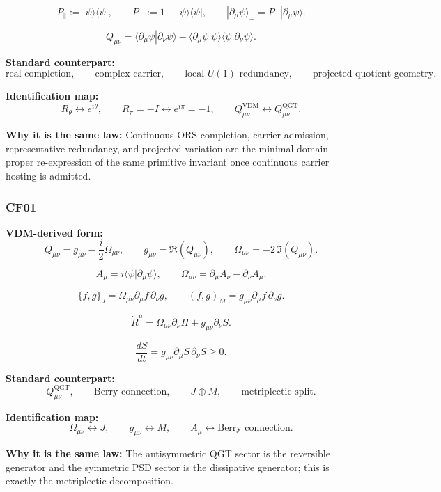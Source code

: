 \documentclass[11pt]{article}
\theoremstyle{definition}
\theoremstyle{plain}
\theoremstyle{remark}
\begin{document}
\[
P_{\parallel}:=|\psi\rangle\langle\psi|,
\qquad
P_{\perp}:=1-|\psi\rangle\langle\psi|,
\qquad
|\partial_\mu\psi\rangle_{\perp}=P_{\perp}|\partial_\mu\psi\rangle.
\]

\[
Q_{\mu\nu}
=
\langle \partial_\mu\psi|\partial_\nu\psi\rangle
-
\langle \partial_\mu\psi|\psi\rangle
\langle \psi|\partial_\nu\psi\rangle.
\]

\textbf{Standard counterpart:}
\[
\text{real completion},
\qquad
\text{complex carrier},
\qquad
\text{local }U(1)\text{ redundancy},
\qquad
\text{projected quotient geometry}.
\]

\textbf{Identification map:}
\[
R_\theta \leftrightarrow e^{i\theta},
\qquad
R_\pi=-I \leftrightarrow e^{i\pi}=-1,
\qquad
Q_{\mu\nu}^{\mathrm{VDM}}
\leftrightarrow
Q_{\mu\nu}^{\mathrm{QGT}}.
\]

\textbf{Why it is the same law:} Continuous ORS completion, carrier admission,
representative redundancy, and projected variation are the minimal domain-proper
re-expression of the same primitive invariant once continuous carrier hosting is
admitted.


\subsubsection*{CF01}
\textbf{VDM-derived form:}
\[
Q_{\mu\nu}
=
g_{\mu\nu}
-
\frac{i}{2}\Omega_{\mu\nu},
\qquad
g_{\mu\nu}=\Re(Q_{\mu\nu}),
\qquad
\Omega_{\mu\nu}=-2\,\Im(Q_{\mu\nu}).
\]

\[
A_\mu=i\langle\psi|\partial_\mu\psi\rangle,
\qquad
\Omega_{\mu\nu}=\partial_\mu A_\nu-\partial_\nu A_\mu.
\]

\[
\{f,g\}_J=\Omega_{\mu\nu}\partial_\mu f\,\partial_\nu g,
\qquad
(f,g)_M=g_{\mu\nu}\partial_\mu f\,\partial_\nu g.
\]

\[
\dot R^\mu
=
\Omega_{\mu\nu}\partial_\nu H
+
g_{\mu\nu}\partial_\nu S.
\]

\[
\frac{dS}{dt}
=
g_{\mu\nu}\partial_\mu S\,\partial_\nu S
\ge 0.
\]

\textbf{Standard counterpart:}
\[
Q_{\mu\nu}^{\mathrm{QGT}},
\qquad
\text{Berry connection},
\qquad
J\oplus M,
\qquad
\text{metriplectic split}.
\]

\textbf{Identification map:}
\[
\Omega_{\mu\nu}\leftrightarrow J,
\qquad
g_{\mu\nu}\leftrightarrow M,
\qquad
A_\mu \leftrightarrow \text{Berry connection}.
\]

\textbf{Why it is the same law:} The antisymmetric QGT sector is the reversible
generator and the symmetric PSD sector is the dissipative generator; this is
exactly the metriplectic decomposition.
\end{document}
